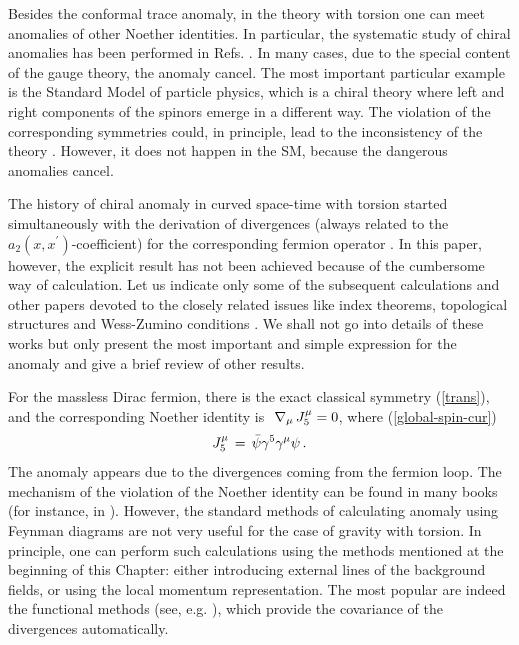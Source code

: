 Besides the conformal trace anomaly, in the theory with torsion
one can meet anomalies of other Noether identities. 
In particular, the systematic study of chiral anomalies has been 
performed in Refs. \cite{beja,adler-a,adba}. In many cases, due 
to the special content of the gauge theory, the anomaly cancel.
The most important particular example is the Standard Model
of particle physics, 
which is a chiral theory where left and right components of the 
spinors emerge in a different way. The violation 
of the corresponding symmetries could, in principle, lead to 
the inconsistency of the theory \cite{grja}. However, it does 
not happen in the SM, because the dangerous anomalies cancel.

The history of chiral anomaly in curved space-time with torsion 
started simultaneously with the derivation of divergences 
(always related to the $a_2(x,x^\prime)$-coefficient) for 
the corresponding fermion operator \cite{gold}. In this
paper, however, the explicit result has not been achieved 
because of the cumbersome way of calculation. Let us 
indicate only some of the subsequent calculations
\cite{kimura,obukhov-spectr,niya,yaki,cogzer1,coggia,doma1}
and other papers devoted to the closely related issues like index 
theorems, topological structures and Wess-Zumino \cite{wz}
conditions \cite{ombh,chza,mavr,yaj,PeeWa99}. We shall not 
go into details of these works but only present the most 
important and simple expression for the anomaly and give
a brief review of other results. 

For the massless Dirac fermion, there is the exact classical 
symmetry (\ref{trans}), and the corresponding Noether identity
is $\,\,\nabla_\mu\,J^\mu_5=0$, where (\ref{global-spin-cur})
$$
J^\mu_5 \,= \,{\bar \psi}\gamma^5\gamma^\mu\psi\,.
$$
The anomaly appears due to the divergences coming from the 
fermion loop. The mechanism of the violation of the Noether 
identity can be found in many books (for instance, in
\cite{collins,itszub}). However, the standard methods of 
calculating anomaly using Feynman diagrams are not very useful 
for the case of gravity with torsion. In principle, one can 
perform such calculations using the methods mentioned at the
beginning of this Chapter: either introducing external 
lines of the background fields, or using the local momentum 
representation. The most popular are indeed the functional 
methods (see, e.g. \cite{fuj}), which provide the covariance 
of the divergences automatically.

